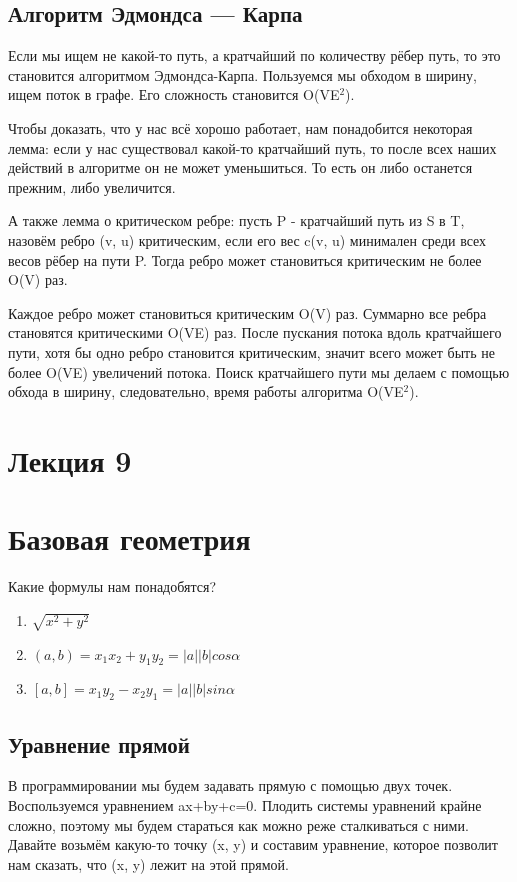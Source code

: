 \documentclass[12pt]{article}
\begin{document}
\subsection*{Алгоритм Эдмондса --- Карпа}
Если мы ищем не какой-то путь, а кратчайший по количеству рёбер путь, то это становится алгоритмом Эдмондса-Карпа. Пользуемся мы обходом в ширину, ищем поток в графе. Его сложность становится O(VE$^2$).

Чтобы доказать, что у нас всё хорошо работает, нам понадобится некоторая лемма: если у нас существовал какой-то кратчайший путь, то после всех наших действий в алгоритме он не может уменьшиться. То есть он либо останется прежним, либо увеличится.

А также лемма о критическом ребре: пусть P - кратчайший путь из S в T, назовём ребро (v, u) критическим, если его вес c(v, u) минимален среди всех весов рёбер на пути P. Тогда ребро может становиться критическим не более O(V) раз.

Каждое ребро может становиться критическим O(V) раз. Суммарно все ребра становятся критическими O(VE) раз. После пускания потока вдоль кратчайшего пути, хотя бы одно ребро становится критическим, значит всего может быть не более O(VE) увеличений потока. Поиск кратчайшего пути мы делаем с помощью обхода в ширину, следовательно, время работы алгоритма O(VE$^2$).

\newpage
\section*{Лекция 9}
\section*{Базовая геометрия}
Какие формулы нам понадобятся?
\begin{enumerate}
\item $\sqrt{x^2+y^2}$
\item $(a, b) = x_1x_2 + y_1y_2 = |a||b|cos \alpha$
\item $[a, b] = x_1y_2 - x_2y_1= |a||b|sin \alpha$
\end{enumerate}

\subsection*{Уравнение прямой}
В программировании мы будем задавать прямую с помощью двух точек. Воспользуемся уравнением ax+by+c=0. Плодить системы уравнений крайне сложно, поэтому мы будем стараться как можно реже сталкиваться с ними. Давайте возьмём какую-то точку (x, y) и составим уравнение, которое позволит нам сказать, что (x, y) лежит на этой прямой.
\end{document}
